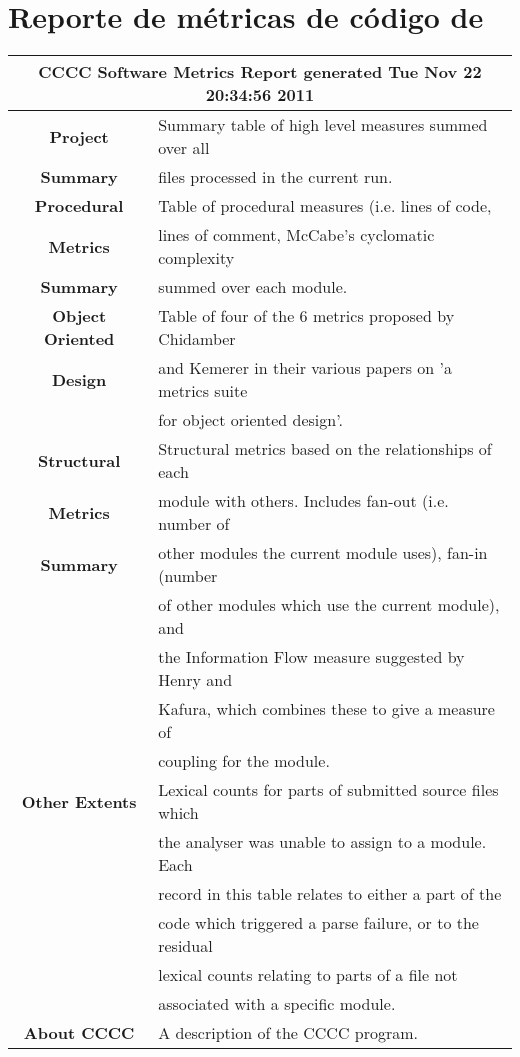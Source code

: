 \chapter{Reporte de métricas de código de \fud}
\label{fud_metrics_report}

\begin{tabular}{|c|l|}
\hline
\multicolumn{2}{|c|}{CCCC Software Metrics Report generated Tue Nov 22 20:34:56 2011} \\
 \hline 
 \textbf{Project}       & Summary table of high level measures summed over all\\
 \textbf{Summary}       & files processed in the current run.  \\
 \hline 
 \textbf{Procedural}    & Table of procedural measures (i.e. lines of code, \\
 \textbf{Metrics}       & lines of comment, McCabe's cyclomatic complexity \\
 \textbf{Summary}       & summed over each module.  \\
 \hline 
 \textbf{Object Oriented} & Table of four of the 6 metrics proposed by Chidamber \\
 \textbf{Design}        & and Kemerer in their various papers on 'a metrics suite \\
                        & for object oriented design'. \\
 \hline 
 \textbf{Structural}    & Structural metrics based on the relationships of each \\
 \textbf{Metrics}       & module with others. Includes fan-out (i.e. number of \\
 \textbf{Summary}       & other modules the current module uses), fan-in (number \\
                        & of other modules which use the current module), and \\
                        & the Information Flow measure suggested by Henry and \\
                        & Kafura, which combines these to give a measure of \\
                        & coupling for the module. \\
 \hline 
 \textbf{Other Extents} & Lexical counts for parts of submitted source files which \\
                        & the analyser was unable to assign to a module. Each \\
                        & record in this table relates to either a part of the \\
                        & code which triggered a parse failure, or to the residual \\
                        & lexical counts relating to parts of a file not \\
                        & associated with a specific module. \\
 \hline 
 \textbf{About CCCC}    & A description of the CCCC program.  \\
 \hline 

\end{tabular}


